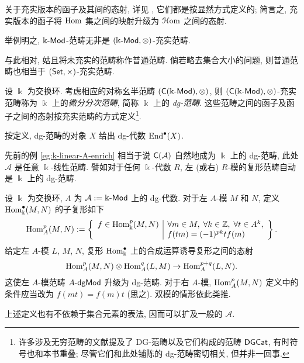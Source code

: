 关于充实版本的函子及其间的态射, 详见 \cite[定义 3.4.1, 3.4.2, 3.4.4]{Li1}, 它们都是按显然方式定义的; 简言之, 充实版本的函子将 $\operatorname{Hom}$ 集之间的映射升级为 $\EuScript{H}\mathrm{om}$ 之间的态射.

举例明之, $\Bbbk\text{-}\mathsf{Mod}$-范畴无非是 $(\Bbbk\text{-}\mathsf{Mod}, \otimes)$-充实范畴.

与此相对, 姑且将未充实的范畴称作普通范畴. 倘若略去集合大小的问题, 则普通范畴也相当于 $(\mathsf{Set}, \times)$-充实范畴.

\begin{definition}\label{def:dgCat}
	设 $\Bbbk$ 为交换环. 考虑相应的对称幺半范畴 $(\mathsf{C}(\Bbbk\text{-}\mathsf{Mod}), \otimes)$, 则 $(\mathsf{C}(\Bbbk\text{-}\mathsf{Mod}), \otimes)$-充实范畴称为 $\Bbbk$ 上的\emph{微分分次范畴}, 简称 $\Bbbk$ 上的 \emph{dg-范畴}. 这些范畴之间的函子及函子之间的态射按充实范畴的方式定义\footnote{许多涉及无穷范畴的文献提及了 DG-范畴以及它们构成的范畴 $\mathsf{DGCat}$, 有时符号也和本书重叠; 尽管它们和此处铺陈的 dg-范畴密切相关, 但并非一回事.}.
\end{definition}

按定义, dg-范畴的对象 $X$ 给出 dg-代数 $\operatorname{End}^\bullet(X)$.

\begin{example}\label{eg:CA-dg-cat}
	先前的例 \ref{eg:k-linear-A-enrich} 相当于说 $\mathsf{C}(\mathcal{A})$ 自然地成为 $\Bbbk$ 上的 dg-范畴, 此处 $\mathcal{A}$ 是任意 $\Bbbk$-线性范畴. 譬如对于任何 $\Bbbk$-代数 $R$, 左 (或右) $R$-模的复形范畴自动是 $\Bbbk$ 上的 dg-范畴.
\end{example}

\begin{example}\label{eg:dg-Hom-cplx}
	设 $\Bbbk$ 为交换环, $A$ 为 $\mathcal{A} := \Bbbk\text{-}\mathsf{Mod}$ 上的 dg-代数. 对于左 $A$-模 $M$ 和 $N$, 定义 $\operatorname{Hom}^\bullet_{\Bbbk}(M, N)$ 的子复形如下
	\[ \operatorname{Hom}^p_A(M, N) := \left\{\begin{array}{r|l}
		f \in \operatorname{Hom}^p_{\Bbbk}(M, N) & \forall m \in M, \; \forall k \in \mathbb{Z}, \; \forall t \in A^k, \\
		& f(tm) = (-1)^{pk} tf(m)
	\end{array}\right\}. \]
	给定左 $A$-模 $L$, $M$, $N$, 复形 $\operatorname{Hom}^\bullet_{\Bbbk}$ 上的合成运算诱导复形之间的态射
	\[ \operatorname{Hom}^p_A(M, N) \otimes \operatorname{Hom}^q_A(L, M) \to \operatorname{Hom}^{p+q}_A(L, N). \]
	这使左 $A$-模范畴 $A\text{-}\mathsf{dgMod}$ 升级为 dg-范畴. 对于右 $A$-模, $\operatorname{Hom}^p_A(M, N)$ 定义中的条件应当改为 $f(mt) = f(m)t$ (思之). 双模的情形依此类推.
	
	上述定义也有不依赖于集合元素的表法, 因而可以扩及一般的 $\mathcal{A}$.
\end{example}

